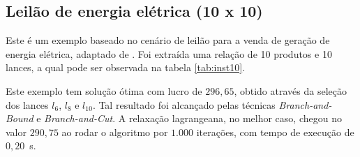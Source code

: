 \documentclass{article}
\begin{document}
	    
    \subsection{Leilão de energia elétrica (10 x 10)}
    
    Este é um exemplo baseado no cenário de leilão para a venda de geração de energia elétrica, adaptado de \cite{Elisa}. Foi extraída uma relação de 10 produtos e 10 lances, a qual pode ser observada na tabela \ref{tab:inst10}.
    
    \begin{table}[h]
	    \centering
	   \caption{Leilão de energia elétrica. Na tabela principal, a ocorrência de um valor $1$ entre o lance $l_j$ e o produto $p_i$ significa que $p_i$ é selecionado por $l_j$.
	   A linha de valores especifica o ganho que a seleção de cada lance $l_j$ traz.}
        \label{tab:inst10}
    \end{table}
    
    Este exemplo tem solução ótima com lucro de $ 296{,}65 $, obtido através da seleção dos lances $ l_6 $, $ l_8 $ e $ l_{10} $. Tal resultado foi alcançado pelas técnicas \emph{Branch-and-Bound} e \emph{Branch-and-Cut}. A relaxação lagrangeana, no melhor caso, chegou no valor $ 290{,}75 $ ao rodar o algoritmo por $1.000$ iterações, com tempo de execução de $0{,}20$~s.
    
\end{document}
